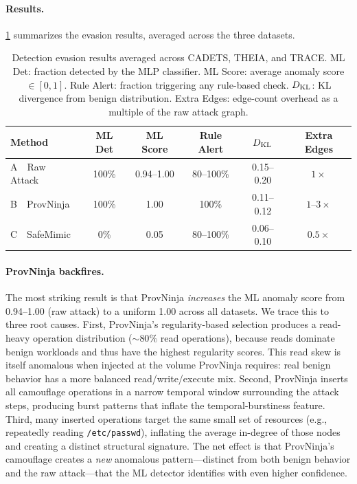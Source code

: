 \paragraph{Results.}
\cref{tab:evasion} summarizes the evasion results, averaged across the three datasets.

\begin{table}[t]
\centering
\caption{Detection evasion results averaged across CADETS, THEIA, and TRACE. ML Det: fraction detected by the MLP classifier. ML Score: average anomaly score $\in [0,1]$. Rule Alert: fraction triggering any rule-based check. $D_{\text{KL}}$: KL divergence from benign distribution. Extra Edges: edge-count overhead as a multiple of the raw attack graph.}
\label{tab:evasion}
\small
\begin{tabular}{lccccc}
\toprule
Method & ML Det & ML Score & Rule Alert & $D_{\text{KL}}$ & Extra Edges \\
\midrule
A~~Raw Attack & 100\% & 0.94--1.00 & 80--100\% & 0.15--0.20 & $1\times$ \\
B~~ProvNinja  & 100\% & 1.00       & 100\%     & 0.11--0.12 & $1$--$3\times$ \\
C~~SafeMimic  &   0\% & 0.05       & 80--100\% & 0.06--0.10 & $0.5\times$ \\
\bottomrule
\end{tabular}
\end{table}

\paragraph{ProvNinja backfires.}
The most striking result is that ProvNinja \emph{increases} the ML anomaly score from 0.94--1.00 (raw attack) to a uniform 1.00 across all datasets.
We trace this to three root causes.
First, ProvNinja's regularity-based selection produces a read-heavy operation distribution (${\sim}80\%$ read operations), because reads dominate benign workloads and thus have the highest regularity scores.
This read skew is itself anomalous when injected at the volume ProvNinja requires: real benign behavior has a more balanced read/write/execute mix.
Second, ProvNinja inserts all camouflage operations in a narrow temporal window surrounding the attack steps, producing burst patterns that inflate the temporal-burstiness feature.
Third, many inserted operations target the same small set of resources (e.g., repeatedly reading \texttt{/etc/passwd}), inflating the average in-degree of those nodes and creating a distinct structural signature.
The net effect is that ProvNinja's camouflage creates a \emph{new} anomalous pattern---distinct from both benign behavior and the raw attack---that the ML detector identifies with even higher confidence.

